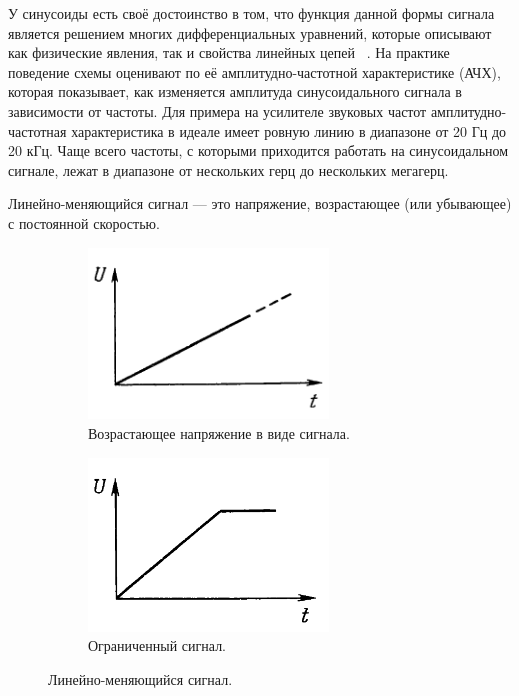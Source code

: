	У синусоиды есть своё достоинство в том, что функция данной формы сигнала является решением многих дифференциальных уравнений, которые описывают как физические явления, так и свойства линейных цепей ~\cite{is1}. На практике поведение схемы оценивают по её амплитудно-частотной характеристике (АЧХ), которая показывает, как изменяется амплитуда синусоидального сигнала в зависимости от частоты. Для примера на усилителе звуковых частот амплитудно-частотная характеристика в идеале имеет ровную линию в диапазоне от 20 Гц до 20 кГц. Чаще всего частоты, с которыми приходится работать на синусоидальном сигнале, лежат в диапазоне от нескольких герц до нескольких мегагерц.

	Линейно-меняющийся сигнал --- это напряжение, возрастающее (или убывающее) с постоянной скоростью.

\begin{figure}[H]\captionsetup[subfigure]{font=normalsize}
     \begin{subfigure}[H]{0.45\textwidth}
         \centering
         \includegraphics[width=0.70\textwidth]{../image/s_la.png}
         \caption{Возрастающее напряжение в виде сигнала.}
     \end{subfigure}
     \hfill
     \begin{subfigure}[H]{0.45\textwidth}
         \centering
         \includegraphics[width=0.70\textwidth]{../image/s_lb.png}
         \caption{Ограниченный сигнал.}
     \end{subfigure}
        \caption{Линейно-меняющийся сигнал.}
\end{figure}

